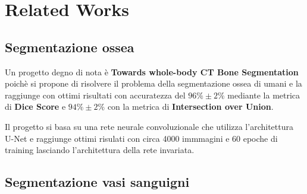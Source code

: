 \section{Related Works}
\subsection{Segmentazione ossea}


Un progetto degno di nota \`e \textbf{Towards whole-body CT Bone Segmentation} \cite{Klein_2018}
poich\`e si propone di risolvere il problema della segmentazione ossea di umani e la raggiunge con
ottimi risultati con accuratezza del $96\%\pm 2\%$ mediante la metrica di \textbf{Dice Score} e $94\%\pm 2\%$ con la metrica di \textbf{Intersection over Union}.


Il progetto si basa su una rete neurale convoluzionale che utilizza l'architettura U-Net \cite{ronneberger2015unet}
e raggiunge ottimi risulati con circa 4000 immmagini e 60 epoche di training lasciando
l'architettura della rete invariata.


\subsection{Segmentazione vasi sanguigni}
%






